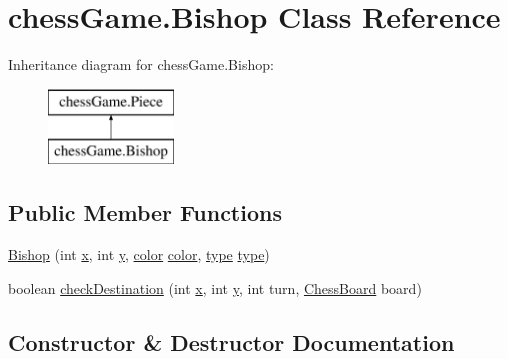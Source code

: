 \hypertarget{classchess_game_1_1_bishop}{}\section{chess\+Game.\+Bishop Class Reference}
\label{classchess_game_1_1_bishop}
Inheritance diagram for chess\+Game.\+Bishop\+:\begin{figure}[H]
\begin{center}
\leavevmode
\includegraphics[height=2.000000cm]{classchess_game_1_1_bishop}
\end{center}
\end{figure}
\subsection*{Public Member Functions}
\begin{DoxyCompactItemize}
\item 
\hyperlink{classchess_game_1_1_bishop_a0e087cf48b5025c9af2fae0e6ef0c36c}{Bishop} (int \hyperlink{classchess_game_1_1_piece_aeb2d3374492005d799aa6b7b85be40e7}{x}, int \hyperlink{classchess_game_1_1_piece_a56e4d8d18eca3fd03a6bd5d6112d6359}{y}, \hyperlink{classchess_game_1_1_piece_ad5117cbbbaebf3a27c4f3c2bcbd6678b}{color} \hyperlink{classchess_game_1_1_piece_ad5117cbbbaebf3a27c4f3c2bcbd6678b}{color}, \hyperlink{classchess_game_1_1_piece_a1370c7f61581a1b72fa8ac2fd1af70a2}{type} \hyperlink{classchess_game_1_1_piece_a1370c7f61581a1b72fa8ac2fd1af70a2}{type})
\item 
boolean \hyperlink{classchess_game_1_1_bishop_a93e6dd0e281ab29a95768a09424a297c}{check\+Destination} (int \hyperlink{classchess_game_1_1_piece_aeb2d3374492005d799aa6b7b85be40e7}{x}, int \hyperlink{classchess_game_1_1_piece_a56e4d8d18eca3fd03a6bd5d6112d6359}{y}, int turn, \hyperlink{classchess_game_1_1_chess_board}{Chess\+Board} board)
\end{DoxyCompactItemize}


\subsection{Constructor \& Destructor Documentation}
\hypertarget{classchess_game_1_1_bishop_a0e087cf48b5025c9af2fae0e6ef0c36c}{}\label{classchess_game_1_1_bishop_a0e087cf48b5025c9af2fae0e6ef0c36c} 
